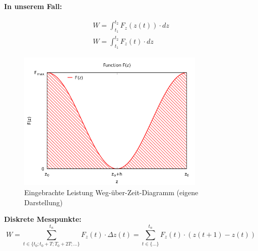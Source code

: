 \textbf{In unserem Fall:}

\begin{equation}
    \begin{aligned}
        W = \int_{t_1}^{t_2} F_z (z(t))\cdot dz\\
        W = \int_{t_1}^{t_2} F_z (t)\cdot dz
    \end{aligned}
\end{equation}

\begin{figure}[h]
    \centering
    \includegraphics[width=0.8\textwidth]{bilder/force-over-distance.png}
    \caption[Eingebrachte Leistung Weg-über-Zeit-Diagramm]{Eingebrachte Leistung Weg-über-Zeit-Diagramm (eigene Darstellung)}\label{fig:EingebrachteLeistungWegZeit}
\end{figure}
\FloatBarrier

\textbf{Diskrete Messpunkte:}
\begin{equation}
    W = \sum_{t \in \{t_0; t_0 + T; T_0 + 2T; \dots\}}^{t_n} F_z(t) \cdot \Delta z(t) = \sum_{t \in \{\dots\}}^{t_n} F_z (t) \cdot (z(t+1)-z(t))
\end{equation}